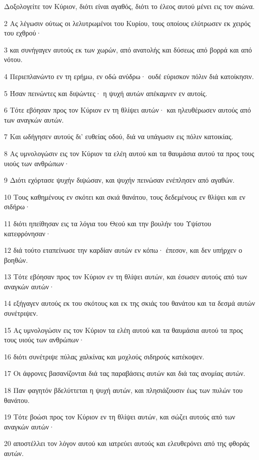 \par Δοξολογείτε τον Κύριον, διότι είναι αγαθός, διότι το έλεος αυτού μένει εις τον αιώνα.
\par 2 Ας λέγωσιν ούτως οι λελυτρωμένοι του Κυρίου, τους οποίους ελύτρωσεν εκ χειρός του εχθρού·
\par 3 και συνήγαγεν αυτούς εκ των χωρών, από ανατολής και δύσεως από βορρά και από νότου.
\par 4 Περιεπλανώντο εν τη ερήμω, εν οδώ ανύδρω· ουδέ εύρισκον πόλιν διά κατοίκησιν.
\par 5 Ήσαν πεινώντες και διψώντες· η ψυχή αυτών απέκαμνεν εν αυτοίς.
\par 6 Τότε εβόησαν προς τον Κύριον εν τη θλίψει αυτών· και ηλευθέρωσεν αυτούς από των αναγκών αυτών.
\par 7 Και ωδήγησεν αυτούς δι' ευθείας οδού, διά να υπάγωσιν εις πόλιν κατοικίας.
\par 8 Ας υμνολογώσιν εις τον Κύριον τα ελέη αυτού και τα θαυμάσια αυτού τα προς τους υιούς των ανθρώπων·
\par 9 Διότι εχόρτασε ψυχήν διψώσαν, και ψυχήν πεινώσαν ενέπλησεν από αγαθών.
\par 10 Τους καθημένους εν σκότει και σκιά θανάτου, τους δεδεμένους εν θλίψει και εν σιδήρω·
\par 11 διότι ηπείθησαν εις τα λόγια του Θεού και την βουλήν του Υψίστου κατεφρόνησαν·
\par 12 διά τούτο εταπείνωσε την καρδίαν αυτών εν κόπω· έπεσον, και δεν υπήρχεν ο βοηθών.
\par 13 Τότε εβόησαν προς τον Κύριον εν τη θλίψει αυτών, και έσωσεν αυτούς από των αναγκών αυτών·
\par 14 εξήγαγεν αυτούς εκ του σκότους και εκ της σκιάς του θανάτου και τα δεσμά αυτών συνέτριψεν.
\par 15 Ας υμνολογώσιν εις τον Κύριον τα ελέη αυτού και τα θαυμάσια αυτού τα προς τους υιούς των ανθρώπων·
\par 16 διότι συνέτριψε πύλας χαλκίνας και μοχλούς σιδηρούς κατέκοψεν.
\par 17 Οι άφρονες βασανίζονται διά τας παραβάσεις αυτών και διά τας ανομίας αυτών.
\par 18 Παν φαγητόν βδελύττεται η ψυχή αυτών, και πλησιάζουσιν έως των πυλών του θανάτου.
\par 19 Τότε βοώσι προς τον Κύριον εν τη θλίψει αυτών, και σώζει αυτούς από των αναγκών αυτών·
\par 20 αποστέλλει τον λόγον αυτού και ιατρεύει αυτούς και ελευθερόνει από της φθοράς αυτών.

